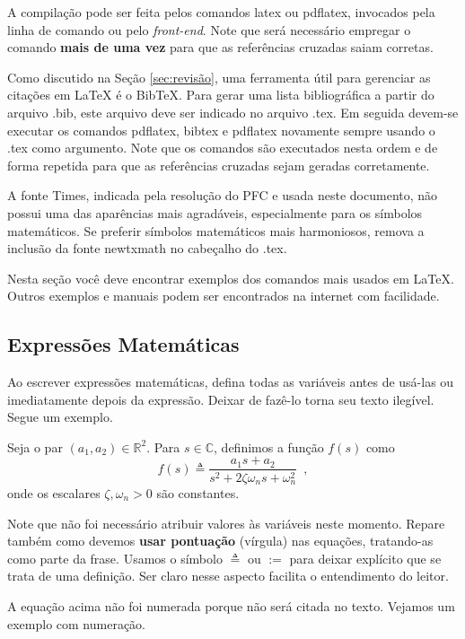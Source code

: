 A compilação pode ser feita pelos comandos \textsf{latex} ou \textsf{pdflatex}, invocados pela linha de comando ou pelo \emph{front-end}. Note que será necessário empregar o comando \textbf{mais de uma vez} para que as referências cruzadas saiam corretas.

Como discutido na Seção \ref{sec:revisão}, uma ferramenta útil para gerenciar as citações em {\LaTeX} é o Bib\TeX. Para gerar uma lista bibliográfica a partir do arquivo .bib, este arquivo deve ser indicado no arquivo .tex. Em seguida devem-se executar os comandos \textsf{pdflatex}, \textsf{bibtex} e \textsf{pdflatex} novamente sempre usando o .tex como argumento. Note que os comandos são executados nesta ordem e de forma repetida para que as referências cruzadas sejam geradas corretamente.

A fonte \textsf{Times}, indicada pela resolução do PFC e usada neste documento, não possui uma das aparências mais agradáveis, especialmente para os símbolos matemáticos. Se preferir símbolos matemáticos mais harmoniosos, remova a inclusão da fonte \textsf{newtxmath} no cabeçalho do .tex.

Nesta seção você deve encontrar exemplos dos comandos mais usados em \LaTeX. Outros exemplos e manuais podem ser encontrados na internet com facilidade.

\subsection{Expressões Matemáticas}

Ao escrever expressões matemáticas, defina todas as variáveis antes de usá-las ou imediatamente depois da expressão. Deixar de fazê-lo torna seu texto ilegível. Segue um exemplo.

Seja o par $(a_1,a_2)\in \mathbb{R}^2$. Para $s\in\mathbb{C}$, definimos a função $f(s)$ como
\[%
f(s)\triangleq \frac{a_1 s+a_2}{s^2+2\zeta\omega_n s+\omega_n^2}
\enspace,
\]
onde os escalares $\zeta,\omega_n>0$ são constantes.

Note que não foi necessário atribuir valores às variáveis neste momento. Repare também como devemos \textbf{usar pontuação} (vírgula) nas equações, tratando-as como parte da frase. Usamos o símbolo $\triangleq$ ou $:=$ para deixar explícito que se trata de uma definição. Ser claro nesse aspecto facilita o entendimento do leitor.

A equação acima não foi numerada porque não será citada no texto. Vejamos um exemplo com numeração.

